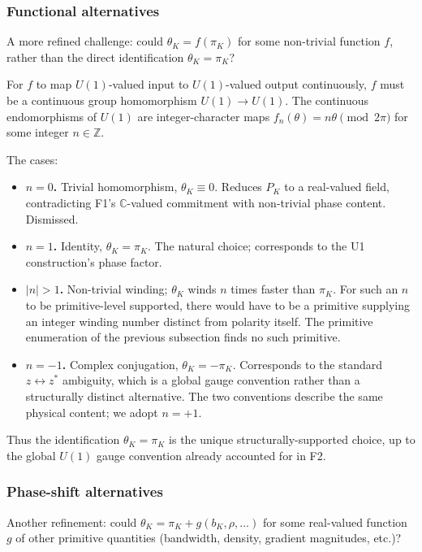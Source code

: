 \documentclass[11pt,a4paper]{article}
\begin{document}
\subsubsection{Functional alternatives}

A more refined challenge: could $\theta_K = f(\pi_K)$ for some non-trivial function $f$, rather than the direct identification $\theta_K = \pi_K$?

For $f$ to map $U(1)$-valued input to $U(1)$-valued output continuously, $f$ must be a continuous group homomorphism $U(1) \to U(1)$. The continuous endomorphisms of $U(1)$ are integer-character maps $f_n(\theta) = n \theta \pmod{2\pi}$ for some integer $n \in \mathbb{Z}$.

The cases:
\begin{itemize}
  \item \textbf{$n = 0$.} Trivial homomorphism, $\theta_K \equiv 0$. Reduces $P_K$ to a real-valued field, contradicting F1's $\mathbb{C}$-valued commitment with non-trivial phase content. Dismissed.
  \item \textbf{$n = 1$.} Identity, $\theta_K = \pi_K$. The natural choice; corresponds to the U1 construction's phase factor.
  \item \textbf{$|n| > 1$.} Non-trivial winding; $\theta_K$ winds $n$ times faster than $\pi_K$. For such an $n$ to be primitive-level supported, there would have to be a primitive supplying an integer winding number distinct from polarity itself. The primitive enumeration of the previous subsection finds no such primitive.
  \item \textbf{$n = -1$.} Complex conjugation, $\theta_K = -\pi_K$. Corresponds to the standard $z \leftrightarrow z^*$ ambiguity, which is a global gauge convention rather than a structurally distinct alternative. The two conventions describe the same physical content; we adopt $n = +1$.
\end{itemize}

Thus the identification $\theta_K = \pi_K$ is the unique structurally-supported choice, up to the global $U(1)$ gauge convention already accounted for in F2.

\subsubsection{Phase-shift alternatives}

Another refinement: could $\theta_K = \pi_K + g(b_K, \rho, \ldots)$ for some real-valued function $g$ of other primitive quantities (bandwidth, density, gradient magnitudes, etc.)?
\end{document}
